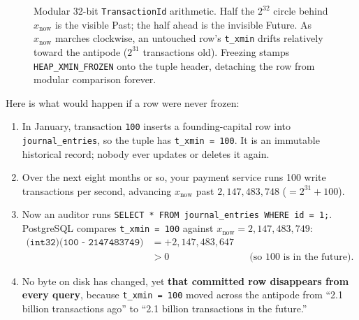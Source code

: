 \begin{figure}[H]
\caption{Modular 32-bit \texttt{TransactionId} arithmetic. Half the $2^{32}$ circle behind $x_{\text{now}}$ is the visible Past; the half ahead is the invisible Future. As $x_{\text{now}}$ marches clockwise, an untouched row's \texttt{t\_xmin} drifts relatively toward the antipode ($2^{31}$ transactions old). Freezing stamps \texttt{HEAP\_XMIN\_FROZEN} onto the tuple header, detaching the row from modular comparison forever.}
\label{ch05:fig-wraparound}
\end{figure}

Here is what would happen if a row were never frozen:
\begin{enumerate}
  \item In January, transaction \texttt{100} inserts a founding-capital row into \texttt{journal\_entries}, so the tuple has \texttt{t\_xmin = 100}. It is an immutable historical record; nobody ever updates or deletes it again.
  \item Over the next eight months or so, your payment service runs 100 write transactions per second, advancing $x_{\text{now}}$ past $2{,}147{,}483{,}748$ ($= 2^{31} + 100$).
  \item Now an auditor runs \texttt{SELECT * FROM journal\_entries WHERE id = 1;}. PostgreSQL compares \texttt{t\_xmin = 100} against $x_{\text{now}} = 2{,}147{,}483{,}749$:
  \begin{align*}
    \texttt{(int32)(100 - 2147483749)} &= +2{,}147{,}483{,}647 \\
    &> 0 && \text{(so 100 is in the future)}.
  \end{align*}
  \item No byte on disk has changed, yet \textbf{that committed row disappears from every query}, because \texttt{t\_xmin = 100} moved across the antipode from ``2.1 billion transactions ago'' to ``2.1 billion transactions in the future.''
\end{enumerate}

